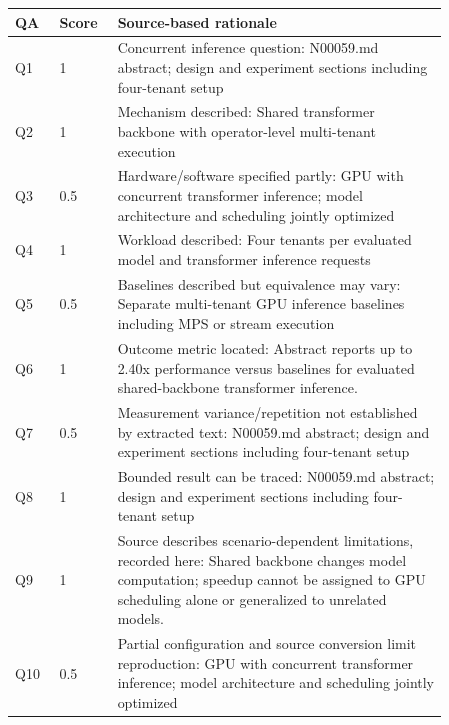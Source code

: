 \begin{longtable}{P{0.09\linewidth}P{0.10\linewidth}P{0.67\linewidth}}
\toprule QA & Score & Source-based rationale\\\midrule\endhead
Q1 & 1 & Concurrent inference question: N00059.md abstract; design and experiment sections including four-tenant setup\\
Q2 & 1 & Mechanism described: Shared transformer backbone with operator-level multi-tenant execution\\
Q3 & 0.5 & Hardware/software specified partly: GPU with concurrent transformer inference; model architecture and scheduling jointly optimized\\
Q4 & 1 & Workload described: Four tenants per evaluated model and transformer inference requests\\
Q5 & 0.5 & Baselines described but equivalence may vary: Separate multi-tenant GPU inference baselines including MPS or stream execution\\
Q6 & 1 & Outcome metric located: Abstract reports up to 2.40x performance versus baselines for evaluated shared-backbone transformer inference.\\
Q7 & 0.5 & Measurement variance/repetition not established by extracted text: N00059.md abstract; design and experiment sections including four-tenant setup\\
Q8 & 1 & Bounded result can be traced: N00059.md abstract; design and experiment sections including four-tenant setup\\
Q9 & 1 & Source describes scenario-dependent limitations, recorded here: Shared backbone changes model computation; speedup cannot be assigned to GPU scheduling alone or generalized to unrelated models.\\
Q10 & 0.5 & Partial configuration and source conversion limit reproduction: GPU with concurrent transformer inference; model architecture and scheduling jointly optimized\\
\bottomrule\end{longtable}

